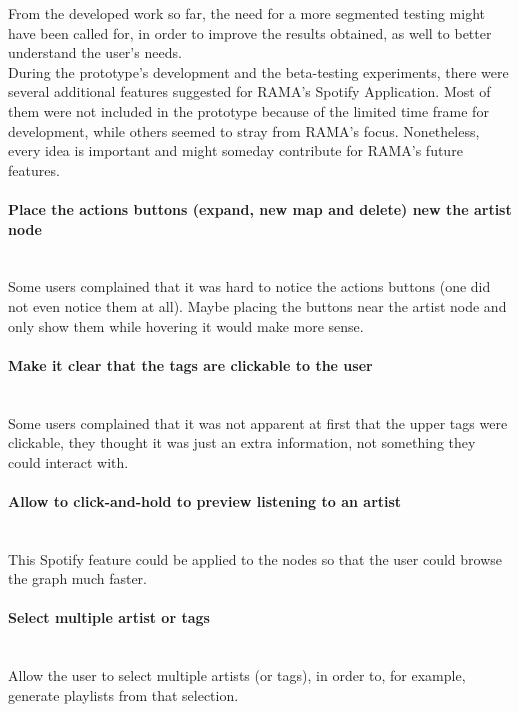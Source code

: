   From the developed work so far, the need for a more segmented testing might have been called for, in order to improve the results obtained, as well to better understand the user's needs. \\

  During the prototype's development and the beta-testing experiments, there were several additional features suggested for RAMA's Spotify Application.
  Most of them were not included in the prototype because of the limited time frame for development, while others seemed to stray from RAMA's focus.
  Nonetheless, every idea is important and might someday contribute for RAMA's future features.

  \paragraph*{Place the actions buttons (expand, new map and delete) new the artist node} \hfill \\
  \indent Some users complained that it was hard to notice the actions buttons (one did not even notice them at all).
  Maybe placing the buttons near the artist node and only show them while hovering it would make more sense.

  \paragraph*{Make it clear that the tags are clickable to the user} \hfill \\
  \indent Some users complained that it was not apparent at first that the upper tags were clickable, they thought it was just an extra information, not something they could interact with.

  \paragraph*{Allow to click-and-hold to preview listening to an artist} \hfill \\
  \indent This Spotify feature could be applied to the nodes so that the user could browse the graph much faster.

  \paragraph*{Select multiple artist or tags} \hfill \\
  \indent Allow the user to select multiple artists (or tags), in order to, for example, generate playlists from that selection.

